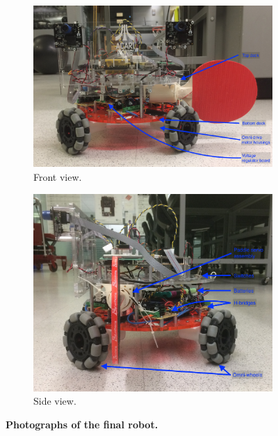 \documentclass[letterpaper, 11pt]{article}
\begin{document}
\begin{enumerate}[label=\textbf{\arabic*.}]
\begin{figure}[H]\ContinuedFloat
    \centering
    \begin{subfigure}[t]{0.8\textwidth}
        \includegraphics[width=\textwidth]{images/front.JPG}
        \caption{Front view.}
    \end{subfigure}

    \begin{subfigure}[t]{0.8\textwidth}
        \includegraphics[width=\textwidth]{images/left.JPG}
        \caption{Side view.}
    \end{subfigure}
    \caption{\textbf{Photographs of the final robot.}}
    \label{fig:pics}
\end{figure}


\end{enumerate}
\end{document}
